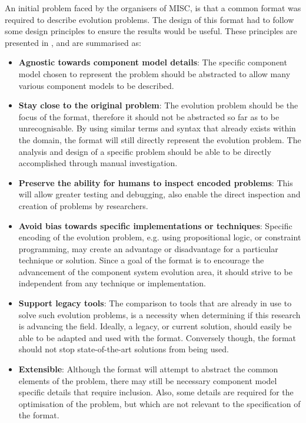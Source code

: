 An initial problem faced by the organisers of MISC, is that a common format was required to describe evolution problems.
The design of this format had to follow some design principles to ensure the results would be useful.
These principles are presented in \citep{treinen2009common}, and are summarised as:

\begin{itemize}
  \item \textbf{Agnostic towards component model details}: 
  The specific component model chosen to represent the problem should be abstracted to allow many various component models to be described.  
  \item \textbf{Stay close to the original problem}: 
  The evolution problem should be the focus of the format, therefore it should not be abstracted so far as to be unrecognisable. 
  By using similar terms and syntax that already exists within the domain, the format will still directly represent the evolution problem. 
  The analysis and design of a specific problem should be able to be directly accomplished through manual investigation.
  \item \textbf{Preserve the ability for humans to inspect encoded problems}:
  This will allow greater testing and debugging, also enable the direct inspection and creation of problems by researchers.
  \item \textbf{Avoid bias towards specific implementations or techniques}:
  Specific encoding of the evolution problem, e.g. using propositional logic, or constraint programming, may create an advantage or disadvantage for a particular technique or solution.
  Since a goal of the format is to encourage the advancement of the component system evolution area, it should strive to be independent from any technique or implementation. 
  \item \textbf{Support legacy tools}:
  The comparison to tools that are already in use to solve such evolution problems, is a necessity when determining if this research is advancing the field.
  Ideally, a legacy, or current solution, should easily be able to be adapted and used with the format.
  Conversely though, the format should not stop state-of-the-art solutions from being used.
  \item \textbf{Extensible}:
  Although the format will attempt to abstract the common elements of the problem, there may still be necessary component model specific details that require inclusion.
  Also, some details are required for the optimisation of the problem, but which are not relevant to the specification of the format.

\end{itemize}
